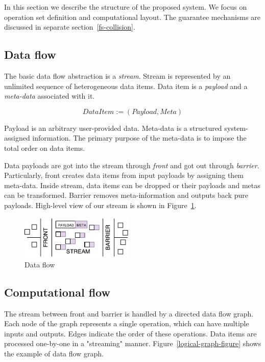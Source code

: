 
\label {fs-model}
In this section we describe the structure of the proposed system. We focus on operation set definition and computational layout. The guarantee mechanisms are discussed in separate section~\ref{fs-collision}.

\subsection{Data flow}

The basic data flow abstraction is a {\it stream}. Stream is represented by an unlimited sequence of heterogeneous data items. Data item is a {\it payload} and a {\it meta-data} associated with it. 

\[DataItem := (Payload, Meta)\]

Payload is an arbitrary user-provided data. Meta-data is a structured system-assigned information. The primary purpose of the meta-data is to impose the total order on data items. 

Data payloads are got into the stream through {\it front} and got out through {\it barrier}. Particularly, front creates data items from input payloads by assigning them meta-data. Inside stream, data items can be dropped or their payloads and metas can be transformed. Barrier removes meta-information and outputs back pure payloads. High-level view of our stream is shown in Figure~\ref{stream}.

\begin{figure}[htbp]
  \centering
  \includegraphics[width=0.48\textwidth]{pics/stream}
  \caption{Data flow}
  \label {stream}
\end{figure}

\subsection{Computational flow}

The stream between front and barrier is handled by a directed data flow graph. Each node of the graph represents a single operation, which can have multiple inputs and outputs. Edges indicate the order of these operations. Data items are processed one-by-one in a "streaming" manner. Figure~\ref{logical-graph-figure} shows the example of data flow graph.

